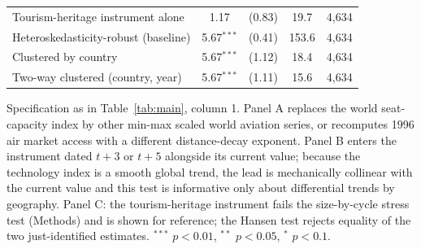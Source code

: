 \begin{table}[htbp]
\begin{threeparttable}
\begin{tabular}{lcccc}
  Tourism-heritage instrument alone & 1.17 & (0.83) & 19.7 & 4,634 \\
  Heteroskedasticity-robust (baseline) & 5.67$^{***}$ & (0.41) & 153.6 & 4,634 \\
  Clustered by country & 5.67$^{***}$ & (1.12) & 18.4 & 4,634 \\
  Two-way clustered (country, year) & 5.67$^{***}$ & (1.11) & 15.6 & 4,634 \\
\bottomrule
\end{tabular}
\begin{tablenotes}\scriptsize
\item Specification as in Table~\ref{tab:main}, column 1. Panel A replaces the world seat-capacity index by other min-max scaled world aviation series, or recomputes 1996 air market access with a different distance-decay exponent. Panel B enters the instrument dated $t+3$ or $t+5$ alongside its current value; because the technology index is a smooth global trend, the lead is mechanically collinear with the current value and this test is informative only about differential trends by geography. Panel C: the tourism-heritage instrument fails the size-by-cycle stress test (Methods) and is shown for reference; the Hansen test rejects equality of the two just-identified estimates. $^{***}$ $p<0.01$, $^{**}$ $p<0.05$, $^{*}$ $p<0.1$.
\end{tablenotes}
\end{threeparttable}
\end{table}
